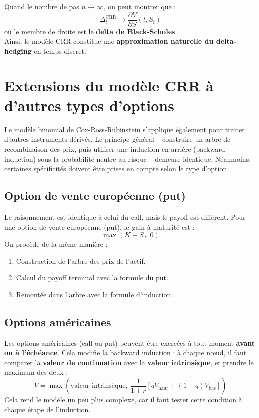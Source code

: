\documentclass[12pt,a4paper]{article}
\begin{document}
Quand le nombre de pas \(n \to \infty\), on peut montrer que :
\[
\boxed{\Delta_t^{\text{CRR}} \longrightarrow \frac{\partial V}{\partial S}(t, S_t)}
\]
où le membre de droite est le \textbf{delta de Black-Scholes}.\\

Ainsi, le modèle CRR constitue une \textbf{approximation naturelle du delta-hedging} en temps discret.



\section{Extensions du modèle CRR à d'autres types d'options}

Le modèle binomial de Cox-Ross-Rubinstein s'applique également pour traiter d'autres instruments dérivés. Le principe général -- construire un arbre de recombinaison des prix, puis utiliser une induction en arrière (backward induction) sous la probabilité neutre au risque -- demeure identique. Néanmoins, certaines spécificités doivent être prises en compte selon le type d'option.

\subsection{Option de vente européenne (put)}
Le raisonnement est identique à celui du call, mais le payoff est différent. Pour une option de vente européenne (put), le gain à maturité est :
\[
\boxed{\max(K - S_T, 0)}
\]
On procède de la même manière :
\begin{enumerate}
    \item Construction de l’arbre des prix de l’actif.
    \item Calcul du payoff terminal avec la formule du put.
    \item Remontée dans l’arbre avec la formule d’induction.
\end{enumerate}

\subsection{Options américaines}
Les options américaines (call ou put) peuvent être exercées à tout moment \textbf{avant ou à l’échéance}. Cela modifie la backward induction : à chaque nœud, il faut comparer la \textbf{valeur de continuation} avec la \textbf{valeur intrinsèque}, et prendre le maximum des deux :
\[
\boxed{V = \max\left( \text{valeur intrinsèque}, \, \frac{1}{1 + r} \left[ q V_\text{haut} + (1 - q) V_\text{bas} \right] \right)}
\]
Cela rend le modèle un peu plus complexe, car il faut tester cette condition à chaque étape de l’induction.
\end{document}
